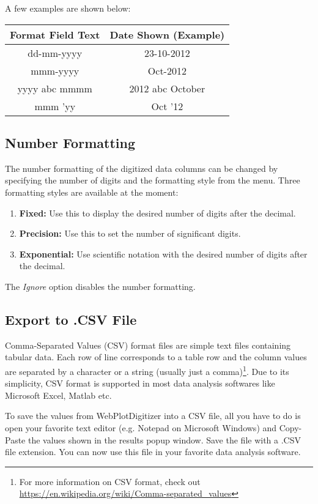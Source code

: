 \documentclass[letterpaper, 11pt]{article}
\begin{document}
A few examples are shown below:

\begin{center}
\begin{tabular}{|c|c|}
\hline
Format Field Text & Date Shown (Example)\\
\hline
dd-mm-yyyy & 23-10-2012\\
mmm-yyyy & Oct-2012\\
yyyy abc mmmm & 2012 abc October\\
mmm 'yy & Oct '12\\
\hline
\end{tabular}
\end{center}

\subsection{Number Formatting}
The number formatting of the digitized data columns can be changed by specifying the number of digits and the formatting style from the menu. Three formatting styles are available at the moment: 
\begin{enumerate}
\item{{\bf Fixed:} Use this to display the desired number of digits after the decimal.}
\item{{\bf Precision:} Use this to set the number of significant digits.}
\item{{\bf Exponential: } Use scientific notation with the desired number of digits after the decimal.}
\end{enumerate}
The \emph{Ignore} option disables the number formatting.

\subsection{Export to .CSV File}
Comma-Separated Values (CSV) format files are simple text files containing tabular data. Each row of line corresponds to a table row and the column values are separated by a character or a string (usually just a comma)\footnote{For more information on CSV format, check out \url{https://en.wikipedia.org/wiki/Comma-separated_values}}. Due to its simplicity, CSV format is supported in most data analysis softwares like Microsoft Excel, Matlab etc.

To save the values from WebPlotDigitizer into a CSV file, all you have to do is open your favorite text editor (e.g. Notepad on Microsoft Windows) and Copy-Paste the values shown in the results popup window. Save the file with a .CSV file extension. You can now use this file in your favorite data analysis software.
\end{document}
